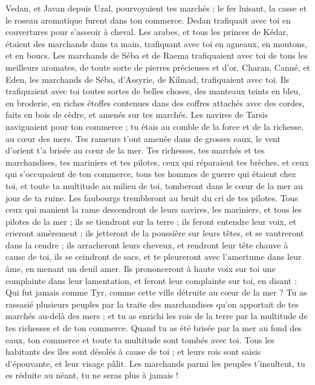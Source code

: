 \begin{multicols}{2}
Vedan, et Javan depuis Uzal, pourvoyaient tes marchés ; le fer luisant, la casse et le roseau aromatique furent dans ton commerce.
Dedan trafiquait avec toi en couvertures pour s’asseoir à cheval.
Les arabes, et tous les princes de Kédar, étaient des marchands dans ta main, trafiquant avec toi en agneaux, en moutons, et en boucs.
Les marchands de Séba et de Raema trafiquaient avec toi de tous les meilleurs aromates, de toute sorte de pierres précieuses et d’or.
Charan, Canné, et Eden, les marchands de Séba, d’Assyrie, de Kilmad, trafiquaient avec toi.
Ils trafiquaient avec toi toutes sortes de belles choses, des manteaux teints en bleu, en broderie, en riches étoffes contenues dans des coffres attachés avec des cordes, faits en bois de cèdre, et amenés sur tes marchés.
Les navires de Tarsis naviguaient pour ton commerce ; tu étais au comble de la force et de la richesse, au cœur des mers.
Tes rameurs t'ont amenée dans de grosses eaux, le vent d'orient t'a brisée au cœur de la mer.
Tes richesses, tes marchés et tes marchandises, tes mariniers et tes pilotes, ceux qui réparaient tes brèches, et ceux qui s’occupaient de ton commerce, tous tes hommes de guerre qui étaient chez toi, et toute ta multitude au milieu de toi, tomberont dans le cœur de la mer au jour de ta ruine.
Les faubourgs trembleront au bruit du cri de tes pilotes.
Tous ceux qui manient la rame descendront de leurs navires, les mariniers, et tous les pilotes de la mer ; ils se tiendront sur la terre ;
ils feront entendre leur voix, et crieront amèrement ; ils jetteront de la poussière sur leurs têtes, et se vautreront dans la cendre ;
ils arracheront leurs cheveux, et rendront leur tête chauve à cause de toi, ils se ceindront de sacs, et te pleureront avec l’amertume dans leur âme, en menant un deuil amer.
Ils prononceront à haute voix sur toi une complainte dans leur lamentation, et feront leur complainte sur toi, en disant : Qui fut jamais comme Tyr, comme cette ville détruite au cœur de la mer ?
Tu as rassasié plusieurs peuples par la traite des marchandises qu'on apportait de tes marchés au-delà des mers ; et tu as enrichi les rois de la terre par la multitude de tes richesses et de ton commerce.
Quand tu as été brisée par la mer au fond des eaux, ton commerce et toute ta multitude sont tombés avec toi.
Tous les habitants des îles sont désolés à cause de toi ; et leurs rois sont saisis d’épouvante, et leur visage pâlit.
Les marchands parmi les peuples t'insultent, tu es réduite au néant, tu ne seras plus à jamais !

\end{multicols}
